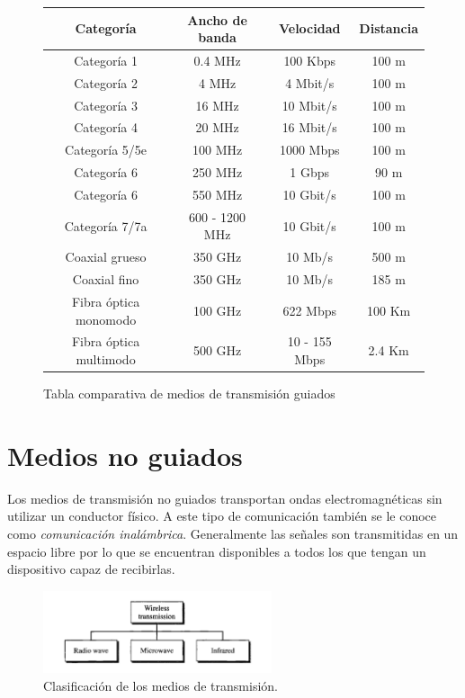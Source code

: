 \documentclass[a4paper,12pt]{article}
\begin{document}
\begin{figure}[h]
\begin{center}
\begin{tabular}{| c | c  | c | c | }
\hline
 \textbf{Categoría} & \textbf{Ancho de banda} & \textbf{Velocidad	} & \textbf{Distancia}\\ 
 \hline
Categoría 1 & 0.4 MHz & 100 Kbps & 100 m\\ 
 \hline
Categoría 2 & 4 MHz & 4 Mbit/s & 100 m\\ 
 \hline
Categoría 3 & 16 MHz & 10 Mbit/s & 100 m\\ 
 \hline
Categoría 4 & 20 MHz & 16 Mbit/s & 100 m\\ 
 \hline
Categoría 5/5e& 100 MHz & 1000 Mbps & 100 m\\ 
 \hline
Categoría 6 & 250 MHz & 1 Gbps & 90 m\\ 
 \hline
Categoría 6 & 550 MHz & 10 Gbit/s & 100 m\\ 
\hline
Categoría 7/7a & 600 - 1200 MHz & 10 Gbit/s  & 100 m \\
\hline
Coaxial grueso & 350 GHz & 10 Mb/s & 500 m \\
\hline
Coaxial fino & 350 GHz  & 10 Mb/s  & 185 m \\
\hline
Fibra óptica monomodo  & 100 GHz  & 622 Mbps & 100 Km \\
\hline
Fibra óptica multimodo & 500 GHz  & 10 - 155 Mbps & 2.4 Km \\
\hline
\end{tabular}
\caption{Tabla comparativa de medios de transmisión guiados}
\end{center}
\end{figure}

\section{Medios no guiados}
Los medios de transmisión no guiados transportan ondas electromagnéticas sin utilizar un conductor físico. A este tipo de comunicación también se le conoce como \textit{comunicación inalámbrica}. Generalmente las señales son transmitidas en un espacio libre por lo que se encuentran disponibles a todos los que tengan un dispositivo capaz de recibirlas.

\begin{figure}[h]
\centering
\includegraphics[width=0.60\textwidth]{figdos}
\caption{Clasificación de los medios de transmisión.}
\label{ene}
\end{figure}
\end{document}
